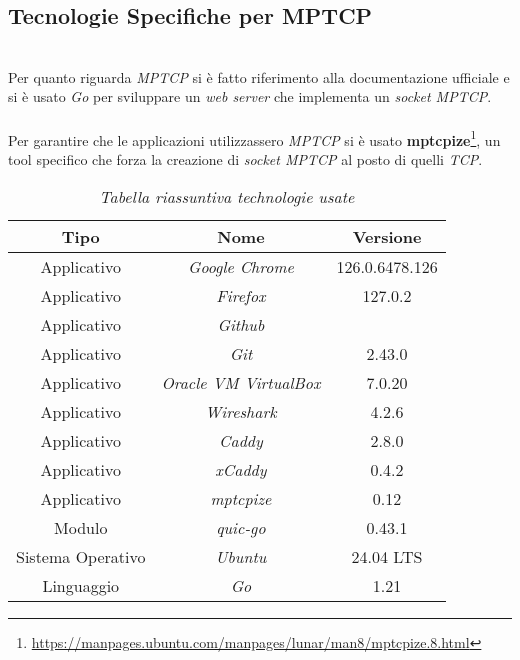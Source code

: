 \subsection{Tecnologie Specifiche per MPTCP}
~\\
\indent Per quanto riguarda \emph{MPTCP} si è fatto riferimento alla documentazione ufficiale \cite{site:mptcp-code} e si è usato \emph{Go} per sviluppare un \emph{web server} che implementa un \emph{socket MPTCP}.
\\\\
Per garantire che le applicazioni utilizzassero \emph{MPTCP} si è usato \textbf{mptcpize}\footnote{\url{https://manpages.ubuntu.com/manpages/lunar/man8/mptcpize.8.html}}, un tool specifico che forza la creazione di \emph{socket MPTCP} al posto di quelli \emph{TCP}.
\hfill
\begin{table}[!h]
    \centering
    \begin{tabular}{|c|c|c|}
        \hline
        \textbf{Tipo} & \textbf{Nome} & \textbf{Versione} \\
        \hline
        Applicativo & \emph{Google Chrome} & 126.0.6478.126 \\
        \hline
        Applicativo & \emph{Firefox} & 127.0.2 \\
        \hline
        Applicativo & \emph{Github} &  \\
        \hline
        Applicativo & \emph{Git} & 2.43.0 \\
        \hline
        Applicativo & \emph{Oracle VM VirtualBox} & 7.0.20 \\
        \hline
        Applicativo & \emph{Wireshark} & 4.2.6 \\
        \hline
        Applicativo & \emph{Caddy} & 2.8.0 \\
        \hline
        Applicativo & \emph{xCaddy} & 0.4.2 \\
        \hline
        Applicativo & \emph{mptcpize} & 0.12 \\
        \hline
        Modulo & \emph{quic-go} &  0.43.1 \\
        \hline
        Sistema Operativo & \emph{Ubuntu} & 24.04 LTS \\
        \hline
        Linguaggio & \emph{Go} & 1.21 \\
        \hline
    \end{tabular}
    \caption{\emph{Tabella riassuntiva technologie usate}}
    \label{table-tecnologie}
\end{table}

